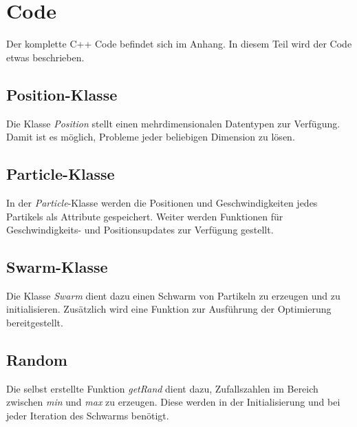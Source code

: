 \section{Code}
Der komplette C++ Code befindet sich im Anhang. In diesem Teil wird der Code etwas beschrieben.

\subsection{Position-Klasse}
Die Klasse \textit{Position} stellt einen mehrdimensionalen Datentypen zur Verfügung. 
Damit ist es möglich, Probleme jeder beliebigen Dimension zu lösen.

\subsection{Particle-Klasse}
In der \textit{Particle}-Klasse werden die Positionen und Geschwindigkeiten jedes Partikels
als Attribute gespeichert. Weiter werden Funktionen für Geschwindigkeits- und Positionsupdates
zur Verfügung gestellt.

\subsection{Swarm-Klasse}
Die Klasse \textit{Swarm} dient dazu einen Schwarm von Partikeln zu erzeugen und zu initialisieren.
Zusätzlich wird eine Funktion zur Ausführung der Optimierung bereitgestellt.

\subsection{Random}
Die selbst erstellte Funktion \textit{getRand} dient dazu, Zufallszahlen im Bereich zwischen \textit{min} und \textit{max} zu erzeugen. Diese werden in der Initialisierung und bei jeder Iteration des Schwarms benötigt. 
